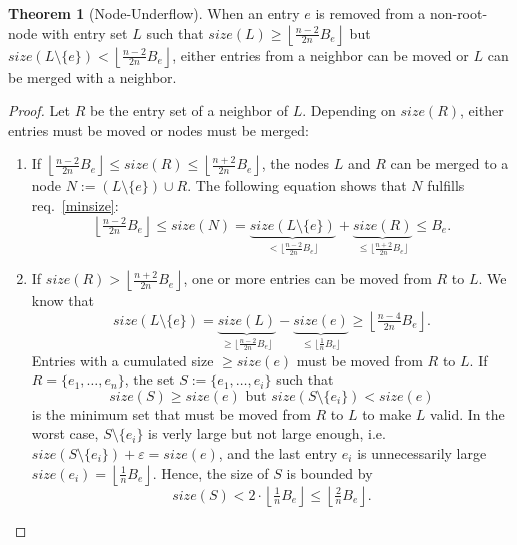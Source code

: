\documentclass[a4paper, 8pt, twoclumn]{scrartcl}
\theoremstyle{plain}
\theoremstyle{definition}
\newtheorem{thm}{Theorem}[section]
\theoremstyle{remark}
\newcommand{\Beff}{B_e}
\newcommand{\Lfloor}{\left\lfloor}
\newcommand{\Rfloor}{\right\rfloor}
\begin{document}
\begin{multicols}{2}
\begin{thm}[Node-Underflow]
When an entry $e$ is removed from a non-root-node with entry set $L$ such that 
$size(L) \geq \Lfloor \tfrac{n-2}{2n} \Beff \Rfloor$ but
$size(L \setminus \{e\}) < \Lfloor \tfrac{n-2}{2n} \Beff \Rfloor$, either
entries from a neighbor can be moved or $L$ can be merged with a neighbor.

\begin{proof}
Let $R$ be the entry set of a neighbor of $L$.
Depending on $size(R)$, either entries must be moved or nodes must be merged:
\begin{enumerate}
\item
If $\Lfloor \tfrac{n-2}{2n} \Beff \Rfloor \leq size(R) 
\leq \Lfloor \tfrac{n+2}{2n} \Beff \Rfloor$, the nodes $L$ and $R$ can be
merged to a node \mbox{$N := (L \setminus \{e\}) \cup R$}.
The following equation shows that $N$ fulfills req.~\ref{minsize}:
\[ \Lfloor \tfrac{n-2}{2n} \Beff \Rfloor 
\leq size(N)
= \underbrace{size(L \setminus \{e\})}_{< \lfloor \frac{n-2}{2n} \Beff \rfloor}
	+ \underbrace{size(R)}_{\leq \lfloor \frac{n+2}{2n} \Beff \rfloor}
\leq \Beff.\]

\item
If \mbox{$size(R) > \Lfloor \tfrac{n+2}{2n} \Beff \Rfloor$}, one or more entries
can be moved from $R$ to $L$.
We know that
\[ size(L \setminus \{e\})
= \underbrace{size(L)}_{\geq \lfloor \frac{n-2}{2n} \Beff \rfloor}
	- \underbrace{size(e)}_{\leq \lfloor \frac{1}{n} \Beff \rfloor}
\geq \Lfloor \tfrac{n-4}{2n} \Beff \Rfloor. \]
Entries with a cumulated size \mbox{$\geq size(e)$} must be moved from 
$R$ to $L$.
If \mbox{$R = \{e_1, \ldots, e_n\}$}, the set \mbox{$S := \{e_1, \ldots, e_i\}$}
such that
\[ size(S) \geq size(e) \text{ but } size(S \setminus \{e_i\}) < size(e) \]
is the minimum set that must be moved from $R$ to $L$ to make $L$ valid.
In the worst case, \mbox{$S \setminus \{e_i\}$} is verly large but not large
enough, i.e.  \mbox{$size(S \setminus \{e_i\}) + \varepsilon = size(e)$}, and
the last entry $e_i$ is unnecessarily large
\mbox{$size(e_i) = \Lfloor \tfrac{1}{n} \Beff \Rfloor$}.
Hence, the size of $S$ is bounded by
\[ size(S) < 2 \cdot \Lfloor \tfrac{1}{n} \Beff \Rfloor
\leq \Lfloor \tfrac{2}{n} \Beff \Rfloor. \]


\end{enumerate}
\end{proof}
\end{thm}
\end{multicols}
\end{document}
